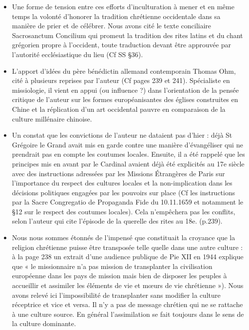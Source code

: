 \begin{itemize}
    \item Une forme de tension entre ces efforts d’inculturation à mener et en même temps la volonté d’honorer la tradition chrétienne occidentale dans sa manière de prier et de célébrer. Nous avons cité le texte conciliaire Sacrosanctum Concilium qui promeut la tradition des rites latins et du chant grégorien propre à l’occident, toute traduction devant être approuvée par l’autorité ecclésiastique du lieu (Cf SS §36).
        \item L’apport d’idées du père bénédictin allemand contemporain Thomas Ohm, cité à plusieurs reprises par l’auteur (Cf pages 239 et 241). Spécialiste en missiologie, il vient en appui (ou influence ?) dans l’orientation de la pensée critique de l’auteur sur les formes européanisantes des églises construites en Chine et la réplication d’un art occidental pauvre en comparaison de la culture millénaire chinoise.

            \item Un constat que les convictions de l’auteur ne dataient pas d’hier : déjà St Grégoire le Grand avait mis en garde contre une manière d’évangéliser qui ne prendrait pas en compte les coutumes locales. Ensuite, il a été rappelé que les principes mis en avant par le Cardinal avaient déjà été explicités au 17e siècle avec des instructions adressées par les Missions Étrangères de Paris sur l’importance du respect des cultures locales et la non-implication dans les décisions politiques engagées par les pouvoirs sur place (Cf les instructions par la Sacre Congregatio de Propaganda Fide du 10.11.1659 et notamment le §12 sur le respect des coutumes locales). Cela n’empêchera pas les conflits, selon l’auteur qui cite l’épisode de la querelle des rites au 18e. (p.239).

                \item Nous nous sommes étonnés de l’impensé que constituait la croyance que la religion chrétienne puisse être transposée telle quelle dans une autre culture : à la page 238 un extrait d’une audience publique de Pie XII en 1944 explique que « le missionnaire n’a pas mission de transplanter la civilisation européenne dans les pays de mission mais bien de disposer les peuples à accueillir et assimiler les éléments de vie et mœurs de vie chrétienne »). Nous avons relevé ici l’impossibilité de transplanter sans modifier la culture réceptrice et vice et versa. Il n’y a pas de message chrétien qui ne se rattache à une culture source. En général l’assimilation se fait toujours dans le sens de la culture dominante.

\end{itemize}
 


